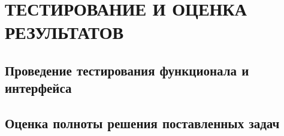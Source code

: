 \section{ТЕСТИРОВАНИЕ И ОЦЕНКА РЕЗУЛЬТАТОВ}

\subsection{Проведение тестирования функционала и интерфейса}
\subsection{Оценка полноты решения поставленных задач}

